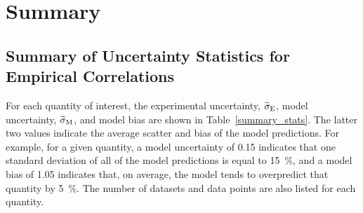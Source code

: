 
\chapter{Summary}
\label{Summary_Chapter}

\section*{Summary of Uncertainty Statistics for Empirical Correlations}

For each quantity of interest, the experimental uncertainty, $\widetilde{\sigma}\sb{E}$, model uncertainty, $\widetilde{\sigma}\sb{M}$, and model bias are shown in Table~\ref{summary_stats}. The latter two values indicate the average scatter and bias of the model predictions. For example, for a given quantity, a model uncertainty of 0.15 indicates that one standard deviation of all of the model predictions is equal to 15~\%, and a model bias of 1.05 indicates that, on average, the model tends to overpredict that quantity by 5~\%. The number of datasets and data points are also listed for each quantity.


